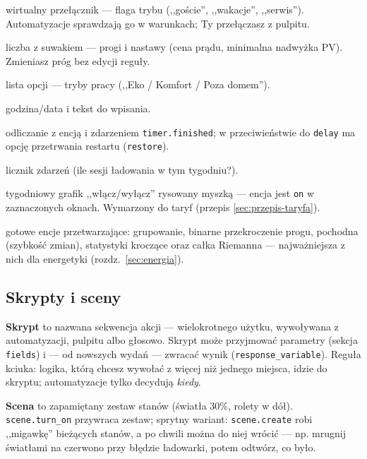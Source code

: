\documentclass[11pt,a4paper]{article}
\begin{document}
\begin{description}[style=nextline]
\item[input\_boolean] wirtualny przełącznik --- flaga trybu (,,goście'', ,,wakacje'', ,,serwis''). Automatyzacje sprawdzają go w warunkach; Ty przełączasz z pulpitu.
\item[input\_number] liczba z suwakiem --- progi i nastawy (cena prądu, minimalna nadwyżka PV). Zmieniasz próg bez edycji reguły.
\item[input\_select] lista opcji --- tryby pracy (,,Eko / Komfort / Poza domem'').
\item[input\_datetime, input\_text] godzina/data i tekst do wpisania.
\item[timer] odliczanie z encją i zdarzeniem \texttt{timer.finished}; w przeciwieństwie do \texttt{delay} ma opcję przetrwania restartu (\texttt{restore}).
\item[counter] licznik zdarzeń (ile sesji ładowania w tym tygodniu?).
\item[schedule] tygodniowy grafik ,,włącz/wyłącz'' rysowany myszką --- encja jest \texttt{on} w zaznaczonych oknach. Wymarzony do taryf (przepis \ref{sec:przepis-taryfa}).
\item[grupa, próg, pochodna, statystyki, Riemann] gotowe encje przetwarzające: grupowanie, binarne przekroczenie progu, pochodna (szybkość zmian), statystyki kroczące oraz całka Riemanna --- najważniejsza z nich dla energetyki (rozdz.~\ref{sec:energia}).
\end{description}

\subsection{Skrypty i sceny}

\textbf{Skrypt} to nazwana sekwencja akcji --- wielokrotnego użytku, wywoływana z automatyzacji, pulpitu albo głosowo. Skrypt może przyjmować parametry (sekcja \texttt{fields}) i --- od nowszych wydań --- zwracać wynik (\texttt{response\_variable}). Reguła kciuka: logika, którą chcesz wywołać z więcej niż jednego miejsca, idzie do skryptu; automatyzacje tylko decydują \emph{kiedy}.

\textbf{Scena} to zapamiętany zestaw stanów (światła 30\%, rolety w dół). \texttt{scene.turn\_on} przywraca zestaw; sprytny wariant: \texttt{scene.create} robi ,,migawkę'' bieżących stanów, a po chwili można do niej wrócić --- np. mrugnij światłami na czerwono przy błędzie ładowarki, potem odtwórz, co było.
\end{document}
